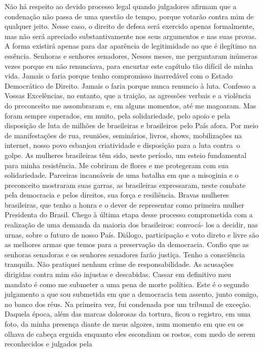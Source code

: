 Não há respeito ao devido processo legal quando julgadores afirmam que a
condenação não passa de uma questão de tempo, porque votarão contra mim
de qualquer jeito. Nesse caso, o direito de defesa será exercido apenas
formalmente, mas não será apreciado substantivamente nos seus argumentos
e nas suas provas. A forma existirá apenas para dar aparência de
legitimidade ao que é ilegítimo na essência. Senhoras e senhores
senadores, Nesses meses, me perguntaram inúmeras vezes porque eu não
renunciava, para encurtar este capítulo tão difícil de minha vida.
Jamais o faria porque tenho compromisso inarredável com o Estado
Democrático de Direito. Jamais o faria porque nunca renuncio à luta.
Confesso a Vossas Excelências, no entanto, que a traição, as agressões
verbais e a violência do preconceito me assombraram e, em alguns
momentos, até me magoaram. Mas foram sempre superados, em muito, pela
solidariedade, pelo apoio e pela disposição de luta de milhões de
brasileiras e brasileiros pelo País afora. Por meio de manifestações de
rua, reuniões, seminários, livros, shows, mobilizações na internet,
nosso povo esbanjou criatividade e disposição para a luta contra~o
golpe. As mulheres brasileiras têm sido, neste período, um esteio
fundamental para minha resistência. Me cobriram de flores e me
protegeram com sua solidariedade. Parceiras incansáveis de uma batalha
em que a misoginia e o preconceito mostraram suas garras, as brasileiras
expressaram, neste combate pela democracia e pelos direitos, sua força e
resiliência. Bravas mulheres brasileiras, que tenho a honra e o dever de
representar como primeira mulher Presidenta do Brasil. Chego à última
etapa desse processo comprometida com a realização de uma demanda da
maioria dos brasileiros: convocá- los a decidir, nas urnas, sobre o
futuro de nosso País. Diálogo, participação e voto direto e livre são as
melhores armas que temos para a preservação da democracia. Confio que as
senhoras senadoras e os senhores senadores farão justiça. Tenho a
consciência tranquila. Não pratiquei nenhum crime de responsabilidade.
As acusações dirigidas contra mim são injustas e descabidas. Cassar em
definitivo meu mandato é como me submeter a uma pena de morte política.
Este é o segundo julgamento a que sou submetida em que a democracia tem
assento, junto comigo, no banco dos réus. Na primeira vez, fui condenada
por um tribunal de exceção. Daquela época, além das marcas dolorosas da
tortura, ficou o registro, em uma foto, da minha presença diante de meus
algozes, num momento em que eu os olhava de cabeça erguida enquanto eles
escondiam os rostos, com medo de serem reconhecidos e julgados pela
